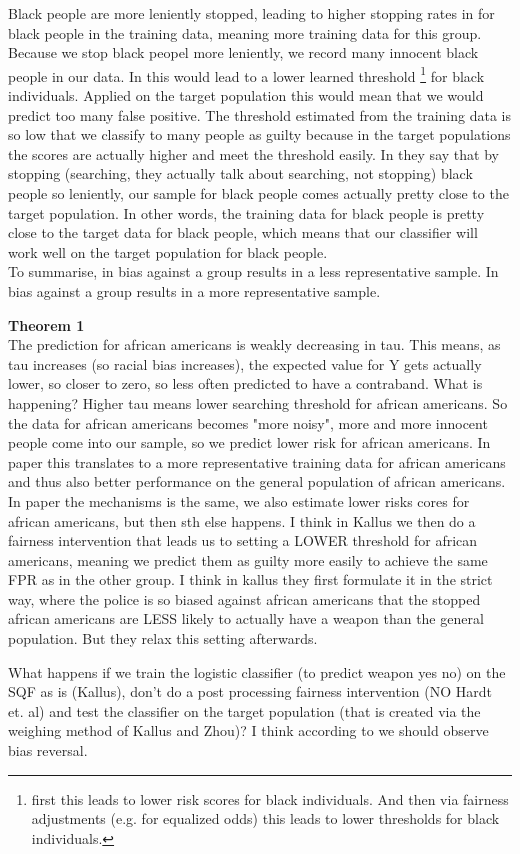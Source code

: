 Black people are more leniently stopped, leading to higher stopping rates in for black people in the training data, meaning
more training data for this group. Because we stop black peopel more leniently, we record many innocent black people in our data.
In \cite{kallus} this would lead to a lower learned threshold \footnote{first this leads to lower risk scores for black individuals. And then via fairness adjustments (e.g. for equalized odds) this leads to lower thresholds for black individuals.}
for black individuals. Applied on the target population this would mean that we would predict too many false positive. The threshold estimated from the training 
data is so low that we classify to many people as guilty because in the target populations the scores are actually higher and meet the threshold easily.
In \cite{RambachanBBOEFW} they say that by stopping (searching, they actually talk about searching, not stopping) black people so leniently, our sample for black people comes actually pretty
close to the target population.
In other words, the training data for black people is pretty close to the target data for black people, which means that our classifier will work well on the
target population for black people. \\
To summarise, in \cite{kallus} bias against a group results in a less representative sample. In \cite{RambachanBBOEFW} bias against a group results in a more representative sample.


\textbf{Theorem 1}\\
The prediction for african americans is weakly decreasing in tau. This means, as tau increases (so racial bias increases), the expected value for Y gets actually lower,
so closer to zero, so less often predicted to have a contraband. What is happening? Higher tau means lower searching threshold for african americans.
So the data for african americans becomes "more noisy", more and more innocent people come into our sample, so we predict lower risk for african americans. 
In \cite{RambachanBBOEFW} paper this translates to a more representative training data for african americans and thus also better performance on the general population of african americans.
In \cite{kallus} paper the mechanisms is the same, we also estimate lower risks cores for african americans, but then sth else happens.
I think in Kallus we then do a fairness intervention that leads us to setting a LOWER threshold for african americans, meaning we predict them as
guilty more easily to achieve the same FPR as in the other group. I think in kallus they first formulate it in the strict way, where the police is so biased against african americans
that the stopped african americans are LESS likely to actually have a weapon than the general population. But they relax this setting afterwards.


What happens if we train the logistic classifier (to predict weapon yes no) on the SQF as is (Kallus), don’t do a post processing fairness intervention (NO Hardt et. al)
and test the classifier on the target population (that is created via the weighing method of Kallus and Zhou)? I think according to \cite{RambachanBBOEFW} we should observe bias reversal.